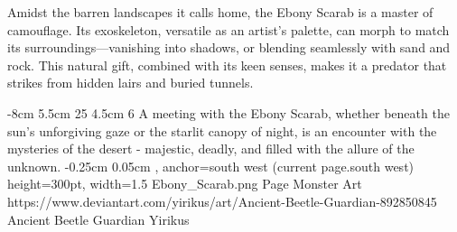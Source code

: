 Amidst the barren landscapes it calls home, the Ebony Scarab is a master of camouflage. Its exoskeleton, versatile as an artist's palette, can morph to match its surroundings—vanishing into shadows, or blending seamlessly with sand and rock. This natural gift, combined with its keen senses, makes it a predator that strikes from hidden lairs and buried tunnels.

{%
	{-8cm}%
	{5.5cm}%
	{25}%
	{4.5cm}%
	{6}%
	{%
		A meeting with the Ebony Scarab, whether beneath the sun's unforgiving gaze or the starlit canopy of night, is an encounter with the mysteries of the desert - majestic, deadly, and filled with the allure of the unknown.%
	}%
}%
{-0.25cm}%
{0.05cm}%
{, anchor=south west}%
{(current page.south west)}%
{height=300pt, width=1.5\textwidth}%
{Ebony_Scarab.png}%
	{Page \thepage}%
	{Monster Art}%
	{https://www.deviantart.com/yirikus/art/Ancient-Beetle-Guardian-892850845}%
	{Ancient Beetle Guardian}%
	{Yirikus}%

\vfill\eject %

